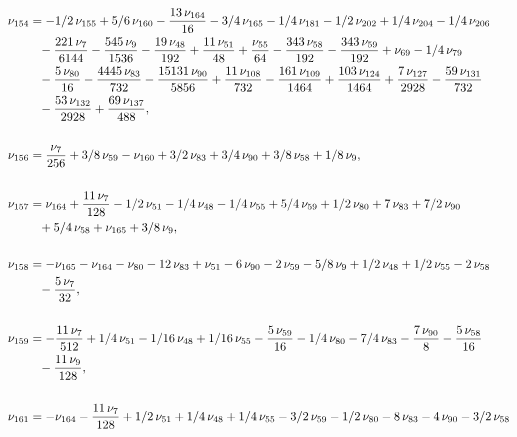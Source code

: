 \documentclass[a4paper,12pt, DIV=14, BCOR=5mm, twoside, headsepline, numbers=noenddot]{scrbook}
\begin{document}
\begin{align}\label{AreaSol14}
\begin{aligned}
\nu_{{154}}&=-1/2\,\nu_{{155}}+5/6\,\nu_{{160}}-{\frac {13\,\nu_{
{164}}}{16}}-3/4\,\nu_{{165}}-1/4\,\nu_{{181}}-1/2\,\nu_{{202}}+1/4\,
\nu_{{204}}-1/4\,\nu_{{206}}\\
 &\hphantom{=}-{\frac {221\,\nu_{{7}}}{6144}}-{\frac {
545\,\nu_{{9}}}{1536}}-{\frac {19\,\nu_{{48}}}{192}}+{\frac {11\,\nu_{
{51}}}{48}}+{\frac {\nu_{{55}}}{64}}-{\frac {343\,\nu_{{58}}}{192}}-{
\frac {343\,\nu_{{59}}}{192}}+\nu_{{69}}-1/4\,\nu_{{79}}\\
 &\hphantom{=}-{\frac {5\,
\nu_{{80}}}{16}}-{\frac {4445\,\nu_{{83}}}{732}}-{\frac {15131\,\nu_{{
90}}}{5856}}+{\frac {11\,\nu_{{108}}}{732}}-{\frac {161\,\nu_{{109}}}{
1464}}+{\frac {103\,\nu_{{124}}}{1464}}+{\frac {7\,\nu_{{127}}}{2928}}
-{\frac {59\,\nu_{{131}}}{732}}\\
 &\hphantom{=}-{\frac {53\,\nu_{{132}}}{2928}}+{
\frac {69\,\nu_{{137}}}{488}}, \\
\\
\nu_{{156}}&={\frac {\nu_{{7}}}{256}}+3/8
\,\nu_{{59}}-\nu_{{160}}+3/2\,\nu_{{83}}+3/4\,\nu_{{90}}+3/8\,\nu_{{58
}}+1/8\,\nu_{{9}}, \\
\\
\nu_{{157}}&=\nu_{{164}}+{\frac {11\,\nu_{{7}}}{128}}
-1/2\,\nu_{{51}}-1/4\,\nu_{{48}}-1/4\,\nu_{{55}}+5/4\,\nu_{{59}}+1/2\,
\nu_{{80}}+7\,\nu_{{83}}+7/2\,\nu_{{90}}\\
 &\hphantom{=}+5/4\,\nu_{{58}}+\nu_{{165}}+3
/8\,\nu_{{9}}, \\
\\
\nu_{{158}}&=-\nu_{{165}}-\nu_{{164}}-\nu_{{80}}-12\,\nu_
{{83}}+\nu_{{51}}-6\,\nu_{{90}}-2\,\nu_{{59}}-5/8\,\nu_{{9}}+1/2\,\nu_
{{48}}+1/2\,\nu_{{55}}-2\,\nu_{{58}}\\
 &\hphantom{=}-{\frac {5\,\nu_{{7}}}{32}}, \\
\\
\nu_{{
159}}&=-{\frac {11\,\nu_{{7}}}{512}}+1/4\,\nu_{{51}}-1/16\,\nu_{{48}}+1
/16\,\nu_{{55}}-{\frac {5\,\nu_{{59}}}{16}}-1/4\,\nu_{{80}}-7/4\,\nu_{
{83}}-{\frac {7\,\nu_{{90}}}{8}}-{\frac {5\,\nu_{{58}}}{16}}\\
 &\hphantom{=}-{\frac {
11\,\nu_{{9}}}{128}}, \\
\\
\nu_{{161}}&=-\nu_{{164}}-{\frac {11\,\nu_{{7}}}{
128}}+1/2\,\nu_{{51}}+1/4\,\nu_{{48}}+1/4\,\nu_{{55}}-3/2\,\nu_{{59}}-
1/2\,\nu_{{80}}-8\,\nu_{{83}}-4\,\nu_{{90}}-3/2\,\nu_{{58}}\\

\end{aligned}
\end{align}
\end{document}
